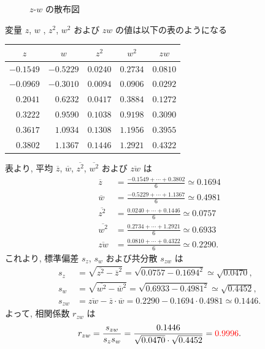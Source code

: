 \begin{qenumerate}
{\begin{figure}[H]
\begin{minipage}{0.49\columnwidth}
				$z$-$w$ の散布図
			\end{minipage}
		\end{figure}
		変量 $z$, $w$ , $z^{2}$, $w^{2}$ および $zw$ の値は以下の表のようになる
		\begin{table}[H]
			\centering
			\begin{tabular}{r|r|r|r|r} \hline
				\multicolumn{1}{c|}{$z$} & \multicolumn{1}{c|}{$w$} & \multicolumn{1}{c|}{$z^{2}$} & \multicolumn{1}{c|}{$w^{2}$} & \multicolumn{1}{c}{$zw$} \\ \hline
				$-0.1549$ & $-0.5229$ & $0.0240$ & $0.2734$ & $0.0810$ \\
				$-0.0969$ & $-0.3010$ & $0.0094$ & $0.0906$ & $0.0292$ \\
				$ 0.2041$ & $ 0.6232$ & $0.0417$ & $0.3884$ & $0.1272$ \\
				$ 0.3222$ & $ 0.9590$ & $0.1038$ & $0.9198$ & $0.3090$ \\
				$ 0.3617$ & $ 1.0934$ & $0.1308$ & $1.1956$ & $0.3955$ \\
				$ 0.3802$ & $ 1.1367$ & $0.1446$ & $1.2921$ & $0.4322$ \\ \hline
			\end{tabular}
		\end{table}
		表より, 平均 $\overline{z}$, $\overline{w}$, $\overline{z^{2}}$, $\overline{w^{2}}$ および $\overline{zw}$ は
		\begin{align}
			\overline{z} &= \frac{-0.1549 + \cdots + 0.3802}{6} \simeq 0.1694\\
			\overline{w} &= \frac{-0.5229 + \cdots + 1.1367}{6} \simeq 0.4981\\
			\overline{z^{2}} &= \frac{0.0240 + \cdots + 0.1446}{6} \simeq 0.0757\\
			\overline{w^{2}} &= \frac{0.2734 + \cdots + 1.2921}{6} \simeq 0.6933\\
			\overline{zw} &= \frac{0.0810 + \cdots + 0.4322}{6} \simeq 0.2290.
		\end{align}
		これより, 標準偏差 $s_{z}$, $s_{w}$ および共分散 $s_{zw}$ は
		\begin{align}
			s_{z} &= \sqrt{\overline{z^{2}} - {\overline{z}}^{2}} = \sqrt{0.0757 - 0.1694^{2}} \simeq \sqrt{0.0470}, \\
			s_{w} &= \sqrt{\overline{w^{2}} - {\overline{w}}^{2}} = \sqrt{0.6933 - 0.4981^{2}} \simeq \sqrt{0.4452}, \\
			s_{zw} &= \overline{zw} - \overline{z}\cdot \overline{w} = 0.2290 - 0.1694\cdot 0.4981 \simeq 0.1446.
		\end{align}
		よって, 相関係数 $r_{zw}$ は
		\begin{align}
			r_{zw} = \frac{s_{zw}}{s_{z}s_{w}} = \frac{0.1446}{\sqrt{0.0470}\cdot \sqrt{0.4452}} = \textcolor{red}{0.9996}.
		\end{align}
	}
\end{qenumerate}